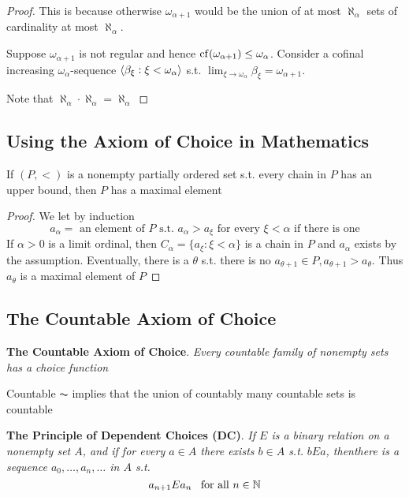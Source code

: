 \documentclass[11pt]{article}
\begin{document}
\begin{proof}
This is because otherwise \(\omega_{\alpha+1}\) would be the union of at most
\(\aleph_\alpha\) sets of cardinality at most \(\aleph_{\alpha}\). 

Suppose \(\omega_{\alpha+1}\) is not regular and hence
\(\operatorname{cf}(\omega_{\alpha+1})\le\omega_{\alpha}\). Consider a cofinal increasing
\(\omega_\alpha\)-sequence \(\langle\beta_\xi:\xi<\omega_\alpha\rangle\) s.t. 
\(\lim_{\xi\to\omega_\alpha}\beta_\xi=\omega_{\alpha+1}\).

Note that \(\aleph_\alpha\cdot\aleph_\alpha=\aleph_\alpha\)
\end{proof}

\subsection{Using the Axiom of Choice in Mathematics}
\label{sec:org508ede3}
\begin{theorem}
If \((P,<)\) is a nonempty partially ordered set s.t. every chain in \(P\) has an
upper bound, then \(P\) has a maximal element
\end{theorem}

\begin{proof}
We let by induction
\begin{equation*}
a_\alpha=\text{ an element of }P\text{ s.t. }a_\alpha>a_\xi
\text{ for every } \xi<\alpha\text{ if there is one}
\end{equation*}
If \(\alpha>0\) is a limit ordinal, then \(C_\alpha=\{a_\xi:\xi<\alpha\}\) is a
chain in \(P\) and \(a_\alpha\) exists by the assumption. Eventually, there is
a \(\theta\) s.t. there is no \(a_{\theta+1}\in P,a_{\theta+1}>a_{\theta}\). Thus
\(a_\theta\) is a maximal element of \(P\)
\end{proof}

\subsection{The Countable Axiom of Choice}
\label{sec:org1f989ae}
\textbf{The Countable Axiom of Choice}. \emph{Every countable family of nonempty sets has a}
\emph{choice function}

\begin{proposition}[]
Countable \(\AC\) implies that the union of countably many
countable sets is countable
\end{proposition}


\textbf{The Principle of Dependent Choices (DC)}. \emph{If \(E\) is a binary relation on a}
\emph{nonempty set \(A\), and if for every \(a\in A\) there exists \(b\in A\) s.t.}
\emph{\(bEa\), thenthere is a sequence \(a_0,\dots,a_n,\dots\) in \(A\) s.t.}
\begin{equation*}
a_{n+1}Ea_n\enspace\text{ for all }n\in\mathbb{N}
\end{equation*}
\end{document}
